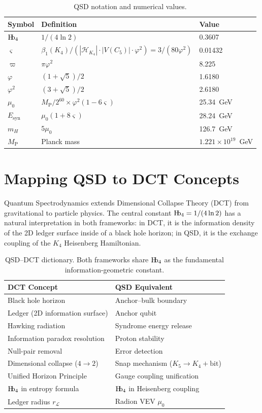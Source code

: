 \documentclass[11pt,a4paper]{article}
\theoremstyle{definition}
\newcommand{\Hb}{\textnormal{H\kern-0.3em b}}
\newcommand{\Hbfour}{\Hb_4}
\newcommand{\strain}{\varsigma}
\newcommand{\specbond}{\varpi}
\newcommand{\Esyn}{E_{\text{syn}}}
\newcommand{\Mpl}{M_{\mathrm{P}}}
\newcommand{\mH}{m_H}
\newcommand{\murad}{\mu_0}
\newcommand{\LL}{\mathcal{L}}
\begin{document}
\begin{table}[h]
\centering
\begin{tabular}{lll}
\toprule
\textbf{Symbol} & \textbf{Definition} & \textbf{Value} \\
\midrule
$\Hbfour$ & $1/(4\ln 2)$ & 0.3607 \\
$\strain$ & $\beta_1(K_4)/(|\mathcal{H}_{K_4}| \cdot |V(C_5)| \cdot \varphi^2) = 3/(80\varphi^2)$ & 0.01432 \\
$\specbond$ & $\pi\varphi^2$ & 8.225 \\
$\varphi$ & $(1+\sqrt{5})/2$ & 1.6180 \\
$\varphi^2$ & $(3+\sqrt{5})/2$ & 2.6180 \\
$\murad$ & $\Mpl / 2^{60} \times \varphi^2(1-6\strain)$ & 25.34~GeV \\
$\Esyn$ & $\murad(1+8\strain)$ & 28.24~GeV \\
$\mH$ & $5\murad$ & 126.7~GeV \\
$\Mpl$ & Planck mass & $1.221 \times 10^{19}$~GeV \\
\bottomrule
\end{tabular}
\caption{QSD notation and numerical values.}
\label{tab:notation}
\end{table}

\section{Mapping QSD to DCT Concepts}
\label{app:dct}

Quantum Spectrodynamics extends Dimensional Collapse Theory (DCT) \cite{Hubka2025DCT} from gravitational to particle physics. The central constant $\Hbfour = 1/(4\ln 2)$ has a natural interpretation in both frameworks: in DCT, it is the information density of the 2D ledger surface inside of a black hole horizon; in QSD, it is the exchange coupling of the $K_4$ Heisenberg Hamiltonian.

\begin{table}[h]
\centering
\begin{tabular}{ll}
\toprule
\textbf{DCT Concept} & \textbf{QSD Equivalent} \\
\midrule
Black hole horizon & Anchor--bulk boundary \\
Ledger (2D information surface) & Anchor qubit \\
Hawking radiation & Syndrome energy release \\
Information paradox resolution & Proton stability \\
Null-pair removal & Error detection \\
Dimensional collapse ($4 \to 2$) & Snap mechanism ($K_5 \to K_4 + \text{bit}$) \\
Unified Horizon Principle & Gauge coupling unification \\
$\Hbfour$ in entropy formula & $\Hbfour$ in Heisenberg coupling \\
Ledger radius $r_\LL$ & Radion VEV $\murad$ \\
\bottomrule
\end{tabular}
\caption{QSD--DCT dictionary. Both frameworks share $\Hbfour$ as the fundamental information-geometric constant.}
\label{tab:dct_dict}
\end{table}
\end{document}
